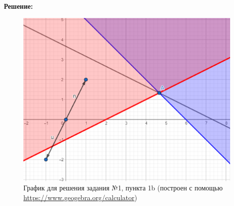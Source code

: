 \begin{center}
    {\bf
    Решение:}
\end{center}

\begin{figure}[ht]
\centering
\includegraphics[]{пункт б.png}
\centering
\caption{График для решения задания №1, пункта 1b (построен с помощью \url{https://www.geogebra.org/calculator})}
\end{figure}

